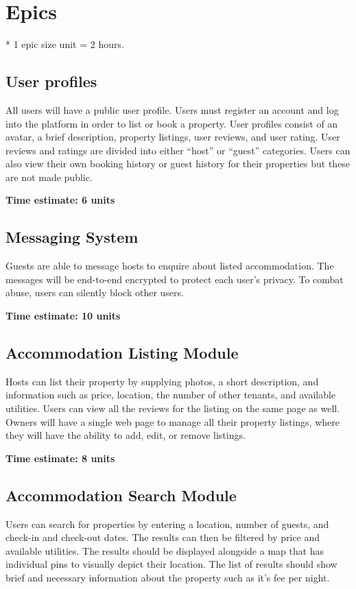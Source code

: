 \documentclass[12pt,a4paper]{article}
\begin{document}
\section *{Epics}
* 1 epic size unit = 2 hours.

\subsection *{User profiles}

All users will have a public user profile. Users must register an account and log into the platform in order to list or book a property. User profiles consist of an avatar, a brief description, property listings, user reviews, and user rating. User reviews and ratings are divided into either “host” or “guest” categories. Users can also view their own booking history or guest history for their properties but these are not made public.

\textbf{Time estimate: 6 units}

\subsection *{Messaging System}

Guests are able to message hosts to enquire about listed accommodation. The messages will be end-to-end encrypted to protect each user’s privacy. To combat abuse, users can silently block other users.

\textbf{Time estimate: 10 units}

\subsection *{Accommodation Listing Module}

Hosts can list their property by supplying photos, a short description, and information such as price, location, the number of other tenants, and available utilities. Users can view all the reviews for the listing on the same page as well. Owners will have a single web page to manage all their property listings, where they will have the ability to add, edit, or remove listings.

\textbf{Time estimate: 8 units}

\subsection *{Accommodation Search Module}

Users can search for properties by entering a location, number of guests, and check-in and check-out dates. The results can then be filtered by price and available utilities. The results should be displayed alongside a map that has individual pins to visually depict their location. The list of results should show brief and necessary information about the property such as it’s fee per night.
\end{document}
